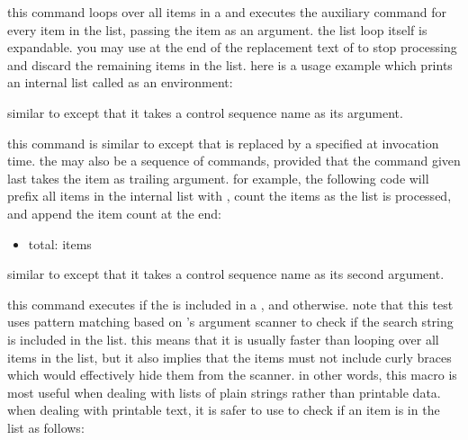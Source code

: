 \begin{ltxsyntax}

this command loops over all items in a  and executes the auxiliary command  for every item in the list, passing the item as an argument. the list loop itself is expandable. you may use  at the end of the replacement text of  to stop processing and discard the remaining items in the list. here is a usage example which prints an internal list called  as an  environment:

\begin{ltxcode}
\begin{itemize}
\renewcommand*{\do}[1]{\item #1}
\dolistloop{\mylist}
\end{itemize}
\end{ltxcode}


similar to  except that it takes a control sequence name as its argument.


this command is similar to  except that  is replaced by a  specified at invocation time. the  may also be a sequence of commands, provided that the command given last takes the item as trailing argument. for example, the following code will prefix all items in the internal list  with , count the items as the list is processed, and append the item count at the end:

\begin{ltxcode}
\begin{itemize}
\item total: \number\value{itemcount} items
\end{itemize}
\end{ltxcode}


similar to  except that it takes a control sequence name as its second argument.


this command executes  if the  is included in a , and  otherwise. note that this test uses pattern matching based on \tex's argument scanner to check if the search string is included in the list. this means that it is usually faster than looping over all items in the list, but it also implies that the items must not include curly braces which would effectively hide them from the scanner. in other words, this macro is most useful when dealing with lists of plain strings rather than printable data. when dealing with printable text, it is safer to use  to check if an item is in the list as follows:


\end{ltxsyntax}
